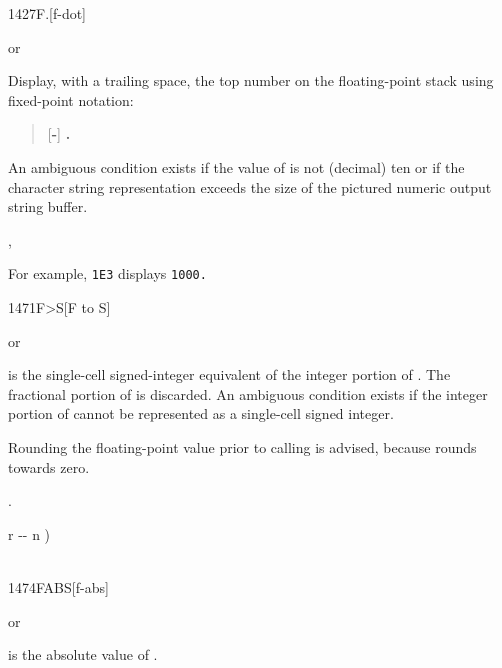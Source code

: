 \enlargethispage{4ex}
\begin{worddef}[Fd]{1427}{F.{}}[f-dot]
\item \stack{}{}  or

	Display, with a trailing space, the top number on the
	floating-point stack using fixed-point notation:
	\begin{quote}
		[\textbf{-}] \textbf{.}
	\end{quote}
	An ambiguous condition exists if the value of 
	is not (decimal) ten or if the character string representation
	exceeds the size of the pictured numeric output string buffer.

\see {},

	\begin{rationale} %
		For example, \texttt{1E3}  displays \texttt{1000.}
	\end{rationale}
\end{worddef}



\begin{worddef}[FtoS]{1471}{F>S}[F to S]
\item {}  or 

	 is the single-cell signed-integer equivalent of the
	integer portion of .  The fractional portion of
	 is discarded.  An ambiguous condition exists if
	the integer portion of  cannot be represented as a
	single-cell signed integer.

\note Rounding the floating-point value prior to calling  is
	advised, because  rounds towards zero.

\see {}.

	\begin{implement}
		\word{:}   r -{}- n ) \\
		\tab {}  \\
		\word{;}
	\end{implement}
\end{worddef}


\begin{worddef}{1474}{FABS}[f-abs]
\item {} or

	 is the absolute value of .
\end{worddef}


